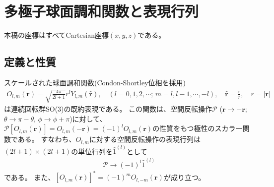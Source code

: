 \documentclass[11pt]{easymemo}
\begin{document}


\section{多極子球面調和関数と表現行列}

本稿の座標はすべてCartesian座標$(x,y,z)$である。

\subsection{定義と性質}

スケールされた球面調和関数(Condon-Shortley位相を採用)
\begin{align}
O_{l,m}(\bm{r})=\sqrt{\frac{4\pi}{2l+1}}r^{l}Y_{l,m}(\hat{\bm{r}}),
\quad
(l=0,1,2,\cdots;\, m=l,l-1,\cdots,-l),
\quad
\hat{\bm{r}}=\frac{\bm{r}}{r},
\quad
r=|\bm{r}|
\end{align}
は連続回転群SO(3)の既約表現である。
この関数は、空間反転操作$\mathcal{P}$ ($\bm{r}\to-\bm{r}$; $\theta\to\pi-\theta$, $\phi\to\phi+\pi$)に対して、$\mathcal{P}[O_{l,m}(\bm{r})]=O_{l,m}(-\bm{r})=(-1)^{l}O_{l,m}(\bm{r})$の性質をもつ極性のスカラー関数である。
すなわち、$O_{l,m}$に対する空間反転操作の表現行列は$(2l+1)\times(2l+1)$の単位行列を$\hat{1}^{(l)}$として
\begin{align}
\mathcal{P}\to(-1)^{l}\hat{1}^{(l)}
\end{align}
である。
また、$[O_{l,m}(\bm{r})]^{*}=(-1)^{m}O_{l,-m}(\bm{r})$が成り立つ。
\end{document}
